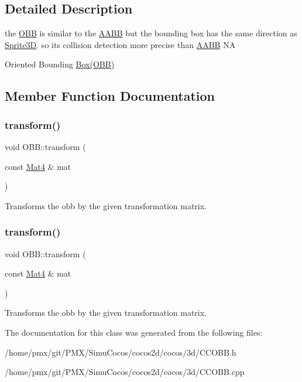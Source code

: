 \subsection{Detailed Description}
the \hyperlink{classOBB}{O\+BB} is similar to the \hyperlink{classAABB}{A\+A\+BB} but the bounding box has the same direction as \hyperlink{classSprite3D}{Sprite3D}. so it\textquotesingle{}s collision detection more precise than \hyperlink{classAABB}{A\+A\+BB}  NA 

Oriented Bounding \hyperlink{classBox}{Box(\+O\+B\+B)} 

\subsection{Member Function Documentation}
\mbox{\label{classOBB_ad62eb091e1ad05d6b9b196f4bb4d94b7}} 
\subsubsection{\texorpdfstring{transform()}{transform()}\hspace{0.1cm}{\footnotesize\ttfamily [1/2]}}
{\footnotesize\ttfamily void O\+B\+B\+::transform (\begin{DoxyParamCaption}\item[{const \hyperlink{classMat4}{Mat4} \&}]{mat }\end{DoxyParamCaption})}

Transforms the obb by the given transformation matrix. \mbox{\label{classOBB_ad62eb091e1ad05d6b9b196f4bb4d94b7}} 
\subsubsection{\texorpdfstring{transform()}{transform()}\hspace{0.1cm}{\footnotesize\ttfamily [2/2]}}
{\footnotesize\ttfamily void O\+B\+B\+::transform (\begin{DoxyParamCaption}\item[{const \hyperlink{classMat4}{Mat4} \&}]{mat }\end{DoxyParamCaption})}

Transforms the obb by the given transformation matrix. 

The documentation for this class was generated from the following files\+:\begin{DoxyCompactItemize}
\item 
/home/pmx/git/\+P\+M\+X/\+Simu\+Cocos/cocos2d/cocos/3d/C\+C\+O\+B\+B.\+h\item 
/home/pmx/git/\+P\+M\+X/\+Simu\+Cocos/cocos2d/cocos/3d/C\+C\+O\+B\+B.\+cpp\end{DoxyCompactItemize}

